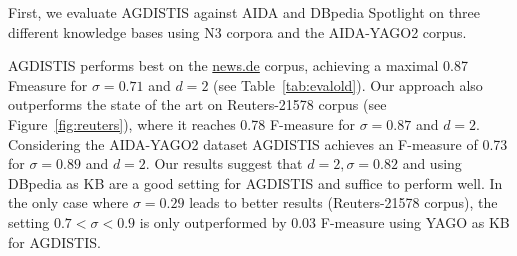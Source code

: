 \begin{table}[tb!]
\centering
\caption{Evaluation of AGDISTIS against AIDA and DBpedia Spotlight. Bold indicates best \mbox{F-measure}.} \label{tab:evalold} 
\end{table}

First, we evaluate AGDISTIS against AIDA and DBpedia Spotlight on three different knowledge bases using N3 corpora and the AIDA-YAGO2 corpus. 

AGDISTIS performs best on the \url{news.de} corpus, achieving a maximal 0.87 F\-measure for $\sigma = 0.71$ and $d = 2$ (see Table~\ref{tab:evalold}).
Our approach also outperforms the state of the art on Reuters-21578 corpus (see Figure~\ref{fig:reuters}), where it reaches 0.78 \mbox{F-measure} for $\sigma = 0.87$ and $d = 2$.
Considering the AIDA-YAGO2 dataset AGDISTIS achieves an \mbox{F-measure} of 0.73 for $\sigma = 0.89$ and $d = 2$.
Our results suggest that $d=2, \sigma=0.82$ and using DBpedia as \ac{KB} are a good setting for AGDISTIS and suffice to perform well. %
In the only case where $\sigma=0.29$ leads to better results (Reuters-21578 corpus), the setting $0.7<\sigma<0.9$ is only outperformed by 0.03 F-measure using YAGO as \ac{KB} for AGDISTIS.


